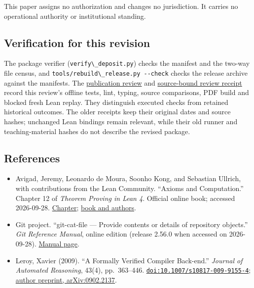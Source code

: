 \documentclass[
  11pt,
]{article}
\newcommand{\passthrough}[1]{#1}
\providecommand{\tightlist}{%
  \setlength{\itemsep}{0pt}\setlength{\parskip}{0pt}}
\begin{document}
This paper assigns no authorization and changes no jurisdiction. It
carries no operational authority or institutional standing.

\hypertarget{verification-for-this-revision}{%
\subsection{Verification for this
revision}\label{verification-for-this-revision}}

The package verifier (\passthrough{\lstinline!verify\_deposit.py!})
checks the manifest and the two-way file census, and
\passthrough{\lstinline!tools/rebuild\_release.py --check!} checks the
release archive against the manifests. The
\href{https://github.com/dbccpage/the_symbol_game/blob/main/omega_engine_education/documentation/030_pfp_proposal_fidelity_protocol_pfp/papers/omega_engine_symbol_game/008_pfp_mssn_tower_challenges_and_retraction_benchmarks/docs/publication_review_2026_10_02.md}{publication
review} and
\href{https://github.com/dbccpage/the_symbol_game/blob/main/omega_engine_education/documentation/030_pfp_proposal_fidelity_protocol_pfp/papers/omega_engine_symbol_game/008_pfp_mssn_tower_challenges_and_retraction_benchmarks/docs/review_validation_2026_10_02.json}{source-bound
review receipt} record this review's offline tests, lint, typing, source
comparisons, PDF build and blocked fresh Lean replay. They distinguish
executed checks from retained historical outcomes. The older receipts
keep their original dates and source hashes; unchanged Lean bindings
remain relevant, while their old runner and teaching-material hashes do
not describe the revised package.

\hypertarget{references}{%
\subsection{References}\label{references}}

\begin{itemize}
\tightlist
\item
  Avigad, Jeremy, Leonardo de Moura, Soonho Kong, and Sebastian Ullrich,
  with contributions from the Lean Community. ``Axioms and
  Computation.'' Chapter 12 of \emph{Theorem Proving in Lean 4}.
  Official online book; accessed 2026-09-28.
  \href{https://lean-lang.org/theorem_proving_in_lean4/Axioms-and-Computation/}{Chapter};
  \href{https://lean-lang.org/theorem_proving_in_lean4/}{book and
  authors}.
\item
  Git project. ``git-cat-file --- Provide contents or details of
  repository objects.'' \emph{Git Reference Manual}, online edition
  (release 2.56.0 when accessed on 2026-09-28).
  \href{https://git-scm.com/docs/git-cat-file}{Manual page}.
\item
  Leroy, Xavier (2009). ``A Formally Verified Compiler Back-end.''
  \emph{Journal of Automated Reasoning}, 43(4), pp.~363--446.
  \href{https://doi.org/10.1007/s10817-009-9155-4}{\nolinkurl{doi:10.1007/s10817-009-9155-4}};
  \href{https://arxiv.org/abs/0902.2137}{author preprint,
  arXiv:0902.2137}.
\end{itemize}
\end{document}
